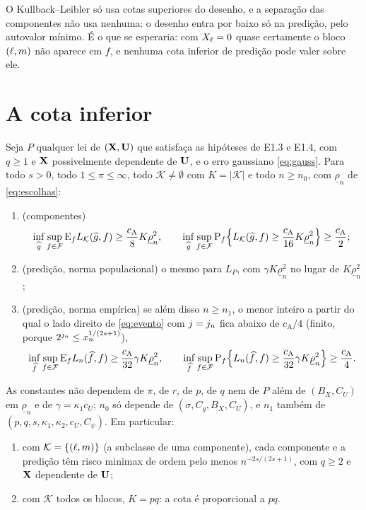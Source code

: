 \documentclass[11pt,a4paper]{article}
\newcommand{\Kcal}{\mathcal{K}}
\newcommand{\Fcal}{\mathcal{F}}
\newcommand{\rlow}{\underline{\rho}_{n}}
\newcommand{\cA}{c_{\mathrm{A}}}
\newcommand{\Lk}{L_{\mathcal{K}}}
\begin{document}
O Kullback--Leibler só usa cotas superiores do desenho, e a separação das
componentes não usa nenhuma: o desenho entra por baixo só na predição, pelo
autovalor mínimo. É o que se esperaria: com $X_{\ell} = 0$ quase certamente o
bloco $(\ell,m)$ não aparece em $f$, e nenhuma cota inferior de predição
pode valer sobre ele.

\section{A cota inferior}

\begin{theorem}\label{thm:inferior}
Seja $P$ qualquer lei de $(\mathbf{X},\mathbf{U})$ que satisfaça as hipóteses de E1.3 e
E1.4, com $q \ge 1$ e $\mathbf{X}$ possivelmente dependente de $\mathbf{U}$, e o erro
gaussiano \eqref{eq:gauss}. Para todo $s > 0$, todo $1 \le \pi \le \infty$,
todo $\Kcal \ne \emptyset$ com $K = |\Kcal|$ e todo $n \ge n_{0}$, com
$\rlow$ de \eqref{eq:escolhas}:
\begin{enumerate}[label=\textup{(\roman*)}, leftmargin=*]
  \item \textup{(componentes)}
    \[
      \inf_{\widehat g}\sup_{f\in\Fcal}\E_{f}\Lk(\widehat g,f)
      \ge \frac{\cA}{8}K\rlow^{2},
      \qquad
      \inf_{\widehat g}\sup_{f\in\Fcal}\Prob_{f}\Bigl\{\Lk(\widehat g,f)
      \ge \frac{\cA}{16}K\rlow^{2}\Bigr\} \ge \frac{\cA}{2};
    \]
  \item \textup{(predição, norma populacional)} o mesmo para $L_{P}$, com
    $\gamma K\rlow^{2}$ no lugar de $K\rlow^{2}$;
  \item \textup{(predição, norma empírica)} se além disso $n \ge n_{1}$, o
    menor inteiro a partir do qual o lado direito de \eqref{eq:evento} com
    $j = j_{n}$ fica abaixo de $\cA/4$ (finito, porque $2^{j_{n}}
    \le x_{n}^{1/(2s+1)}$),
    \[
      \inf_{\widehat f}\sup_{f\in\Fcal}\E_{f}L_{n}(\widehat f,f)
      \ge \frac{\cA}{32}\gamma K\rlow^{2},
      \qquad
      \inf_{\widehat f}\sup_{f\in\Fcal}\Prob_{f}\Bigl\{L_{n}(\widehat f,f)
      \ge \frac{\cA}{32}\gamma K\rlow^{2}\Bigr\} \ge \frac{\cA}{4}.
    \]
\end{enumerate}
As constantes não dependem de $\pi$, de $r$, de $p$, de $q$ nem de $P$ além
de $(B_{X},C_{U})$ em $\rlow$ e de $\gamma = \kappa_{1}c_{U}$; $n_{0}$ só
depende de $(\sigma,C_{g},B_{X},C_{U})$, e $n_{1}$ também de $(p,q,s,
\kappa_{1},\kappa_{2},c_{U},C_{\psi})$. Em particular:
\begin{enumerate}[label=\textup{(\alph*)}, leftmargin=*, nosep]
  \item com $\Kcal = \{(\cv,\md)\}$ (a subclasse de uma componente), cada
    componente e a predição têm risco minimax de ordem pelo menos
    $n^{-2s/(2s+1)}$, com $q \ge 2$ e $\mathbf{X}$ dependente de $\mathbf{U}$;
  \item com $\Kcal$ todos os blocos, $K = pq$: a cota é proporcional a $pq$.
\end{enumerate}
\end{theorem}
\end{document}
